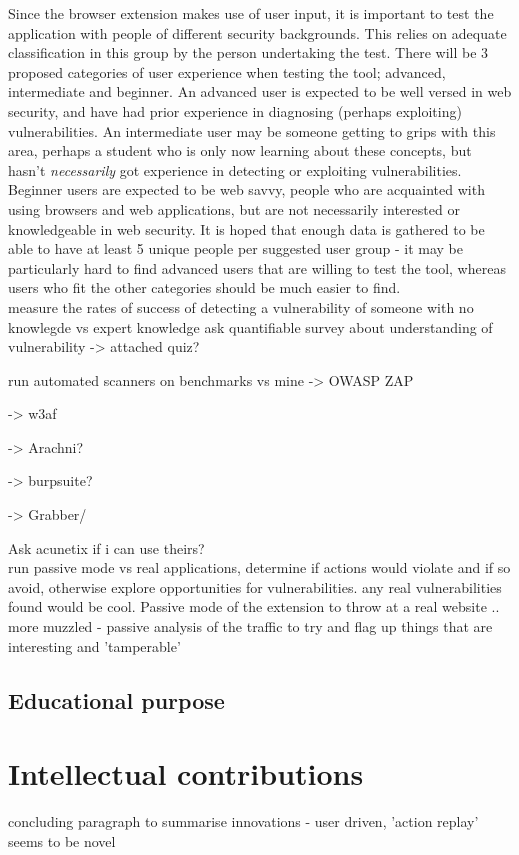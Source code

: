 Since the browser extension makes use of user input, it is important to test the application with people of different security backgrounds. This relies on adequate classification in this group by the person undertaking the test. There will be 3 proposed categories of user experience when testing the tool; advanced, intermediate and beginner. An advanced user is expected to be well versed in web security, and have had prior experience in diagnosing (perhaps exploiting) vulnerabilities. An intermediate user may be someone getting to grips with this area, perhaps a student who is only now learning about these concepts, but hasn't \emph{necessarily} got experience in detecting or exploiting vulnerabilities. Beginner users are expected to be web savvy, people who are acquainted with using browsers and web applications, but are not necessarily interested or knowledgeable in web security. It is hoped that enough data is gathered to be able to have at least 5 unique people per suggested user group - it may be particularly hard to find advanced users that are willing to test the tool, whereas users who fit the other categories should be much easier to find. \\



measure the rates of success of detecting a vulnerability of someone with no knowlegde vs expert knowledge
ask quantifiable survey about understanding of vulnerability -> attached quiz?


run automated scanners on benchmarks vs mine
-> OWASP ZAP

-> w3af

-> Arachni?

-> burpsuite?

-> Grabber/

Ask acunetix if i can use theirs? \\

run passive mode vs real applications, determine if actions would violate and if so avoid, otherwise explore opportunities for vulnerabilities. any real vulnerabilities found would be cool.  Passive mode of the extension to throw at a real website .. more muzzled - passive analysis of the traffic to try and flag up things that are interesting and 'tamperable'

\subsection{Educational purpose}




\section{Intellectual contributions}
concluding paragraph to summarise innovations - user driven, 'action replay' seems to be novel
